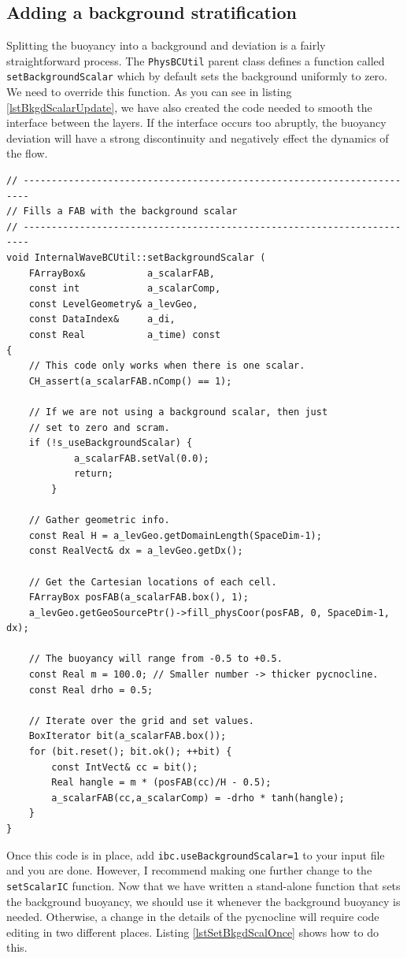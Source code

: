 \documentclass[12pt]{article}
\begin{document}
\subsection{Adding a background stratification}
Splitting the buoyancy into a background and deviation is a fairly straightforward process. The \texttt{PhysBCUtil} parent class defines a function called \texttt{setBackgroundScalar} which by default sets the background uniformly to zero. We need to override this function. As you can see in listing \ref{lstBkgdScalarUpdate}, we have also created the code needed to smooth the interface between the layers. If the interface occurs too abruptly, the buoyancy deviation will have a strong discontinuity and negatively effect the dynamics of the flow.
\begin{lstlisting}[caption={The updates to \texttt{InternalWaveBCUtil} needed to split the buoyancy.},label=lstBkgdScalarUpdate]
// -----------------------------------------------------------------------
// Fills a FAB with the background scalar
// -----------------------------------------------------------------------
void InternalWaveBCUtil::setBackgroundScalar (
	FArrayBox&           a_scalarFAB,
	const int            a_scalarComp,
	const LevelGeometry& a_levGeo,
	const DataIndex&     a_di,
	const Real           a_time) const
{
    // This code only works when there is one scalar.
    CH_assert(a_scalarFAB.nComp() == 1);

    // If we are not using a background scalar, then just
    // set to zero and scram.
    if (!s_useBackgroundScalar) {
            a_scalarFAB.setVal(0.0);
            return;
        }

	// Gather geometric info.
    const Real H = a_levGeo.getDomainLength(SpaceDim-1);
    const RealVect& dx = a_levGeo.getDx();

    // Get the Cartesian locations of each cell.
    FArrayBox posFAB(a_scalarFAB.box(), 1);
    a_levGeo.getGeoSourcePtr()->fill_physCoor(posFAB, 0, SpaceDim-1, dx);

    // The buoyancy will range from -0.5 to +0.5.
    const Real m = 100.0; // Smaller number -> thicker pycnocline.
    const Real drho = 0.5;

    // Iterate over the grid and set values.
    BoxIterator bit(a_scalarFAB.box());
    for (bit.reset(); bit.ok(); ++bit) {
        const IntVect& cc = bit();
        Real hangle = m * (posFAB(cc)/H - 0.5);
        a_scalarFAB(cc,a_scalarComp) = -drho * tanh(hangle);
    }
}
\end{lstlisting}
Once this code is in place, add \texttt{ibc.useBackgroundScalar=1} to your input file and you are done. However, I recommend making one further change to the \texttt{setScalarIC} function. Now that we have written a stand-alone function that sets the background buoyancy, we should use it whenever the background buoyancy is needed. Otherwise, a change in the details of the pycnocline will require code editing in two different places. Listing \ref{lstSetBkgdScalOnce} shows how to do this.
\end{document}
